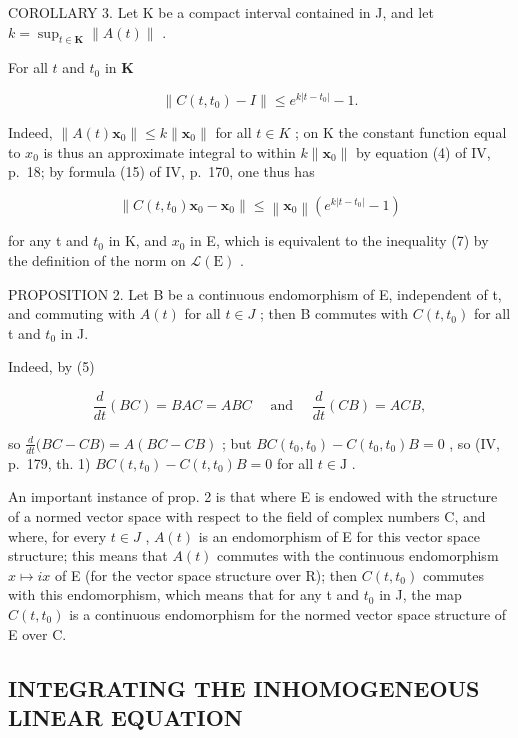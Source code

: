 COROLLARY 3. Let K be a compact interval contained in J, and let \(k = \sup_{t \in \mathbf{K}} \| A(t) \|\) .

For all \(t\) and \(t_0\) in \(\mathbf{K}\)

\[
\left\| C \left(t, t _ {0}\right) - I \right\| \leqslant e ^ {k \left| t - t _ {0} \right|} - 1.\tag{7}
\]

Indeed, \(\|A(t)\mathbf{x}_{0}\|\leqslant k\|\mathbf{x}_{0}\|\) for all \(t\in K\) ; on K the constant function equal to \(x_{0}\) is thus an approximate integral to within \(k\|\mathbf{x}_{0}\|\) by equation (4) of IV, p.~18; by formula (15) of IV, p.~170, one thus has

\[
\left\| C \left(t, t _ {0}\right) \mathbf {x} _ {0} - \mathbf {x} _ {0} \right\| \leqslant \left\| \mathbf {x} _ {0} \right\| \left(e ^ {k | t - t _ {0} |} - 1\right)
\]

for any t and \(t_{0}\) in K, and \(x_{0}\) in E, which is equivalent to the inequality (7) by the definition of the norm on \(\mathcal{L}(\mathrm{E})\) .

PROPOSITION 2. Let B be a continuous endomorphism of E, independent of t, and commuting with \(A(t)\) for all \(t \in J\) ; then B commutes with \(C(t, t_{0})\) for all t and \(t_{0}\) in J.

Indeed, by (5)

\[
\frac {d}{d t} (B C) = B A C = A B C \quad \text { and } \quad \frac {d}{d t} (C B) = A C B,
\]

so \(\frac{d}{dt}\bigl (BC - CB\bigr) = A(BC - CB)\) ; but \(BC(t_0,t_0) - C(t_0,t_0)B = 0\) , so (IV, p.~179, th. 1) \(BC(t,t_0) - C(t,t_0)B = 0\) for all \(t\in \mathrm{J}\) .

An important instance of prop. 2 is that where E is endowed with the structure of a normed vector space with respect to the field of complex numbers C, and where, for every \(t \in J\) , \(A(t)\) is an endomorphism of E for this vector space structure; this means that \(A(t)\) commutes with the continuous endomorphism \(x \mapsto i x\) of E (for the vector space structure over R); then \(C(t, t_{0})\) commutes with this endomorphism, which means that for any t and \(t_{0}\) in J, the map \(C(t, t_{0})\) is a continuous endomorphism for the normed vector space structure of E over C.

\subsection{INTEGRATING THE INHOMOGENEOUS LINEAR EQUATION}

